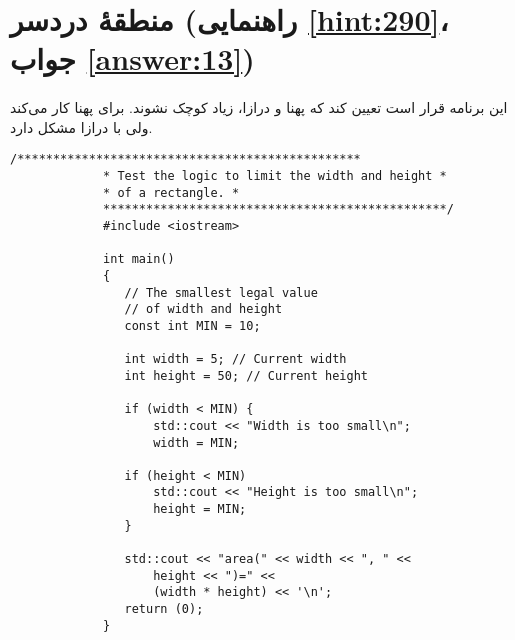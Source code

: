 \section[منطقهٔ دردسر]{منطقهٔ دردسر \protect{} (راهنمایی \ref{hint:290}، جواب \ref{answer:13})}
\paragraph{}\label{prog:26}
این برنامه قرار است تعیین کند که پهنا و درازا، زیاد کوچک نشوند. برای پهنا کار می‌کند ولی با درازا مشکل دارد.

\begin{LTR}
        \begin{lstlisting}[style=C++Style]
             /************************************************
             * Test the logic to limit the width and height *
             * of a rectangle. *
             ************************************************/
             #include <iostream>

             int main()
             {
             	// The smallest legal value
             	// of width and height
             	const int MIN = 10;

             	int width = 5; // Current width
             	int height = 50; // Current height

             	if (width < MIN) {
             		std::cout << "Width is too small\n";
             		width = MIN;

             	if (height < MIN)
             		std::cout << "Height is too small\n";
             		height = MIN;
             	}

             	std::cout << "area(" << width << ", " <<
             		height << ")=" <<
             		(width * height) << '\n';
             	return (0);
             }
        \end{lstlisting}
\end{LTR}